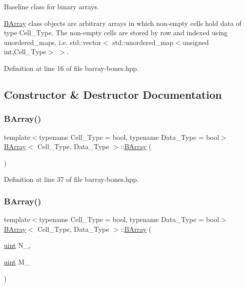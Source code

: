 Baseline class for binary arrays. 

{\ttfamily \hyperlink{class_b_array}{B\+Array}} class objects are arbitrary arrays in which non-\/empty cells hold data of type {\ttfamily Cell\+\_\+\+Type}. The non-\/empty cells are stored by row and indexed using {\ttfamily unordered\+\_\+map}s, i.\+e. {\ttfamily std\+::vector$<$ std\+::unordered\+\_\+map$<$unsigned int,Cell\+\_\+\+Type$>$ $>$}. 

Definition at line 16 of file barray-\/bones.\+hpp.



\subsection{Constructor \& Destructor Documentation}
\mbox{\label{class_b_array_a1bbfcc43ad43f30fd448b63e9ab5861f}} 
\subsubsection{\texorpdfstring{B\+Array()}{BArray()}\hspace{0.1cm}{\footnotesize\ttfamily [1/5]}}
{\footnotesize\ttfamily template$<$typename Cell\+\_\+\+Type = bool, typename Data\+\_\+\+Type = bool$>$ \\
\hyperlink{class_b_array}{B\+Array}$<$ Cell\+\_\+\+Type, Data\+\_\+\+Type $>$\+::\hyperlink{class_b_array}{B\+Array} (\begin{DoxyParamCaption}{ }\end{DoxyParamCaption})\hspace{0.3cm}{\ttfamily [inline]}}



Definition at line 37 of file barray-\/bones.\+hpp.

\mbox{\label{class_b_array_a411b65e1985396261ca9df2923a6f3c6}} 
\subsubsection{\texorpdfstring{B\+Array()}{BArray()}\hspace{0.1cm}{\footnotesize\ttfamily [2/5]}}
{\footnotesize\ttfamily template$<$typename Cell\+\_\+\+Type = bool, typename Data\+\_\+\+Type = bool$>$ \\
\hyperlink{class_b_array}{B\+Array}$<$ Cell\+\_\+\+Type, Data\+\_\+\+Type $>$\+::\hyperlink{class_b_array}{B\+Array} (\begin{DoxyParamCaption}\item[{\hyperlink{typedefs_8hpp_a91ad9478d81a7aaf2593e8d9c3d06a14}{uint}}]{N\+\_\+,  }\item[{\hyperlink{typedefs_8hpp_a91ad9478d81a7aaf2593e8d9c3d06a14}{uint}}]{M\+\_\+ }\end{DoxyParamCaption})\hspace{0.3cm}{\ttfamily [inline]}}



